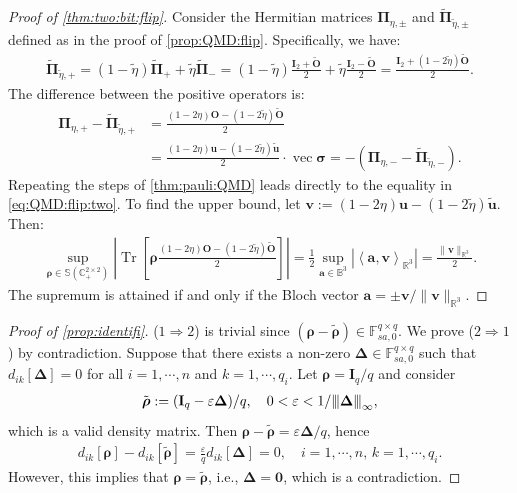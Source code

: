 \documentclass[noinfoline]{imsart}\setcounter{tocdepth}{2}
\renewcommand{\b}[1]{\mathbb{#1}} %
\newcommand{\m}[1]{\mathbf{#1}} %
\newcommand{\mb}[1]{\boldsymbol{#1}} %
\newcommand{\tr}[1]{\operatorname{Tr}\left[#1\right]}
\newcommand{\vertiii}[1]{{\left\vert\kern-0.25ex\left\vert\kern-0.25ex\left\vert #1 
    \right\vert\kern-0.25ex\right\vert\kern-0.25ex\right\vert}} %
\newcommand{\innpr}[2]{{\left\langle {#1},{#2}\right\rangle}} %
\renewcommand{\vec}{\operatorname{vec}}
\theoremstyle{plain}
\begin{document}
\begin{appendix}
\begin{proof}[Proof of \cref{thm:two:bit:flip}]
Consider the Hermitian matrices $\m{\Pi}_{\eta, \pm}$ and $\tilde{\m{\Pi}}_{\tilde{\eta}, \pm}$ defined as in the proof of \cref{prop:QMD:flip}. Specifically, we have:
\begin{align*}
    \tilde{\m{\Pi}}_{\tilde{\eta}, +} = (1-\tilde{\eta}) \tilde{\m{\Pi}}_{+} + \tilde{\eta} \tilde{\m{\Pi}}_{-} = (1-\tilde{\eta}) \frac{\m{I}_{2} + \tilde{\m{O}}}{2} + \tilde{\eta} \frac{\m{I}_{2} - \tilde{\m{O}}}{2} = \frac{\m{I}_{2} + (1-2 \tilde{\eta}) \tilde{\m{O}}}{2}. 
\end{align*}
The difference between the positive operators is:
\begin{align*}
    \m{\Pi}_{\eta, +} - \tilde{\m{\Pi}}_{\tilde{\eta}, +} &= \frac{(1-2 \eta) \m{O} - (1-2 \tilde{\eta}) \tilde{\m{O}}}{2} \\
    &= \frac{(1-2\eta) \m{u} - (1-2 \tilde{\eta}) \tilde{\m{u}}}{2} \cdot \vec{\mb{\sigma}} = - (\m{\Pi}_{\eta, -} - \tilde{\m{\Pi}}_{\tilde{\eta}, -}).
\end{align*}
Repeating the steps of \cref{thm:pauli:QMD} leads directly to the equality in \eqref{eq:QMD:flip:two}. 
To find the upper bound, let $\m{v} := (1-2\eta) \m{u} - (1-2 \tilde{\eta}) \tilde{\m{u}}$. Then:
\begin{align*}
    \sup_{\mb{\rho} \in \b{S}(\b{C}_{+}^{2 \times 2})} \left|\tr {\mb{\rho} \frac{(1-2 \eta) \m{O} - (1-2 \tilde{\eta}) \tilde{\m{O}}}{2}} \right| 
    = \frac{1}{2} \sup_{\m{a} \in \b{B}^{3}} |\innpr{\m{a}}{\m{v}}_{\b{R}^{3}}| 
    = \frac{\|\m{v}\|_{\b{R}^{3}}}{2}.
\end{align*}
The supremum is attained if and only if the Bloch vector $\m{a} = \pm \m{v}/ \|\m{v}\|_{\b{R}^{3}}$.
\end{proof}


\begin{proof}[Proof of \cref{prop:identifi}] ($1 \Rightarrow 2$) is trivial since $(\mb{\rho} - \tilde{\mb{\rho}}) \in \b{F}_{sa, 0}^{q \times q}$. We prove ($2 \Rightarrow 1$) by contradiction. Suppose that there exists a non-zero $\mb{\Delta} \in \b{F}_{sa, 0}^{q \times q}$ such that $d_{ik}[\mb{\Delta}] = 0$ for all $i = 1, \cdots, n$ and $k = 1, \cdots, q_{i}$.
Let $\mb{\rho} = \m{I}_{q}/q$ and consider 
\begin{align*}
    \tilde{\mb{\rho}} := (\m{I}_{q} - \varepsilon \mb{\Delta})/q, \quad 0 < \varepsilon < 1/ \vertiii{\mb{\Delta}}_{\infty},
\end{align*}
which is a valid density matrix. Then $\mb{\rho} - \tilde{\mb{\rho}} = \varepsilon \mb{\Delta}/q$, hence
\begin{align*}
    d_{ik}[\mb{\rho}] - d_{ik}[\tilde{\mb{\rho}}] = \frac{\varepsilon}{q} d_{ik}[\mb{\Delta}] = 0, \quad i = 1, \cdots, n, \, k = 1, \cdots, q_{i}.
\end{align*} 
However, this implies that $\mb{\rho} = \tilde{\mb{\rho}}$, i.e., $\mb{\Delta} = \m{0}$, which is a contradiction.
\end{proof}



\end{appendix}
\end{document}
